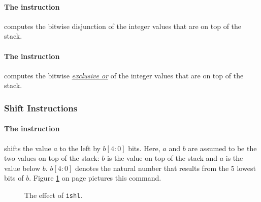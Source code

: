\paragraph{The instruction }
computes the bitwise disjunction of the integer values that are on top of the stack.


\paragraph{The instruction }
computes the bitwise \href{http://en.wikipedia.org/wiki/Exclusive_or}{\emph{exclusive or}} of the integer values that are on top of the stack.

\subsubsection{Shift Instructions}

\paragraph{The instruction }
shifts the value $a$ to the left by $b[4:0]$ bits.  Here, $a$ and $b$ are assumed to be the two
values on top of the stack:  $b$ is the value on top of the stack and $a$ is the value below $b$.
$b[4:0]$ denotes the natural number that results from the 5 lowest bits of $b$.  Figure
\ref{fig:ijvm-shl} on page \pageref{fig:ijvm-shl} pictures this command.

\setlength{\unitlength}{0.5cm}
\begin{figure}[!ht]
  \centering
{}
  \caption{The effect of \texttt{ishl}.}
  \label{fig:ijvm-shl}
\end{figure}

